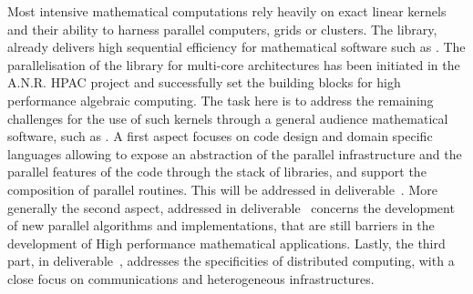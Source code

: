 \begin{workpackage}
\begin{tasklist}
\begin{task}[title=Linbox,PM=40,id=hpc-linbox, lead=UJF,wphases={3-48!0.37,12-36},issue=101]
Most intensive mathematical computations rely heavily on exact linear kernels
and their ability to harness parallel computers, grids or clusters. The \Linbox
library, already delivers high sequential efficiency for mathematical software
such as \Sage. The parallelisation of the library for multi-core architectures
has been initiated in the A.N.R. HPAC project and successfully set the building
blocks for high performance algebraic computing. 
The task here is to  address the remaining challenges for the use of such
kernels through a general audience mathematical software, such as \Sage.
A first aspect focuses on code design and domain specific languages allowing to
expose an abstraction of the parallel infrastructure and the parallel features
of the code through the stack of libraries, and support the
composition of parallel routines. This will be addressed in
deliverable~. More generally the second aspect, addressed
in deliverable~ concerns the 
development of new parallel algorithms and implementations, that are still
barriers in the development of High performance mathematical
applications. Lastly, the third part, in
deliverable~, addresses the specificities of  distributed
computing, with a close focus on communications and heterogeneous infrastructures.


\end{task}


\end{tasklist}
\end{workpackage}
